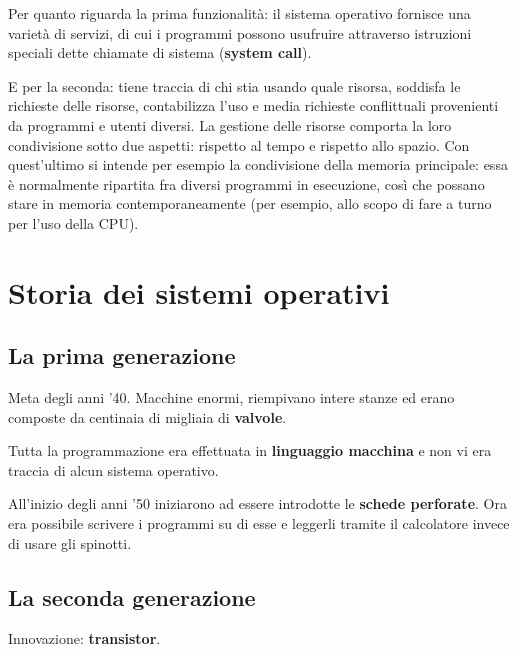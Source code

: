 Per quanto riguarda la prima funzionalità: il sistema operativo fornisce una varietà di servizi, di cui i programmi possono usufruire attraverso istruzioni speciali dette chiamate di sistema (\textbf{system call}).

E per la seconda: tiene traccia di chi stia usando quale risorsa, soddisfa le richieste delle risorse, contabilizza l'uso e media richieste conflittuali provenienti da programmi e utenti diversi.
La gestione delle risorse comporta la loro condivisione sotto due aspetti: rispetto al tempo e rispetto allo spazio. Con quest'ultimo si intende per esempio la condivisione della memoria principale: essa è normalmente ripartita fra diversi programmi in esecuzione, così che possano stare in memoria contemporaneamente (per esempio, allo scopo di fare a turno per l'uso della CPU).

\section{Storia dei sistemi operativi}

\subsection{La prima generazione}
Meta degli anni '40.
Macchine enormi, riempivano intere stanze ed erano composte da centinaia di migliaia di \textbf{valvole}.

Tutta la programmazione era effettuata in \textbf{linguaggio macchina} e non vi era traccia di alcun sistema operativo.

All'inizio degli anni '50 iniziarono ad essere introdotte le \textbf{schede perforate}. Ora era possibile scrivere i programmi su di esse e leggerli tramite il calcolatore invece di usare gli spinotti.

\subsection{La seconda generazione}
Innovazione: \textbf{transistor}.

